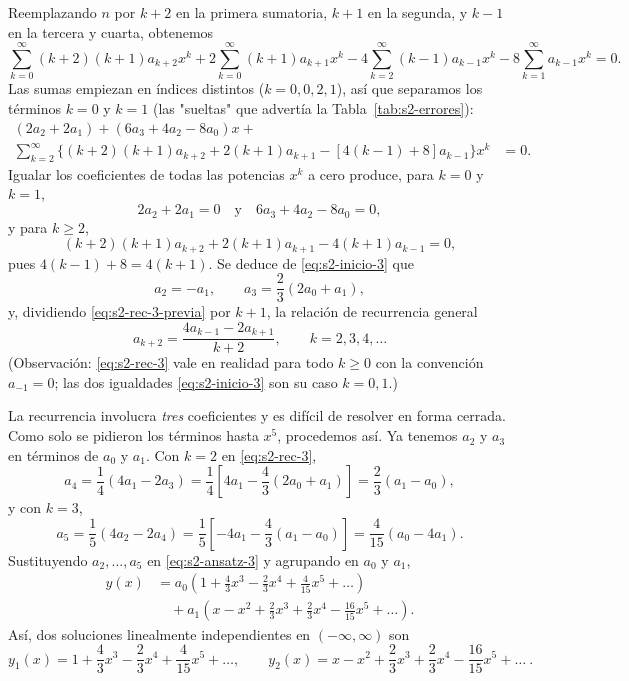 \begin{example}
Reemplazando $n$ por $k + 2$ en la primera sumatoria, $k + 1$ en la segunda, y $k - 1$ en la tercera y cuarta, obtenemos
\[ \sum_{k=0}^{\infty} (k+2)(k+1)a_{k+2}x^k + 2\sum_{k=0}^{\infty} (k+1)a_{k+1}x^k - 4\sum_{k=2}^{\infty} (k-1)a_{k-1}x^k - 8\sum_{k=1}^{\infty} a_{k-1}x^k = 0. \]
Las sumas empiezan en índices distintos ($k=0,0,2,1$), así que separamos los términos $k = 0$ y $k = 1$ (las "sueltas" que advertía la Tabla~\ref{tab:s2-errores}):
\begin{align*}
(2a_2 + 2a_1) + (6a_3 + 4a_2 - 8a_0)x + \quad & \\
\sum_{k=2}^{\infty} \{(k+2)(k+1)a_{k+2} + 2(k+1)a_{k+1} - [4(k-1) + 8]a_{k-1}\}x^k &= 0.
\end{align*}
Igualar los coeficientes de todas las potencias $x^k$ a cero produce, para $k = 0$ y $k = 1$,
\begin{equation}
2a_2 + 2a_1 = 0 \quad \text{y} \quad 6a_3 + 4a_2 - 8a_0 = 0,
\label{eq:s2-inicio-3}
\end{equation}
y para $k \ge 2$,
\begin{equation}
(k+2)(k+1)a_{k+2} + 2(k+1)a_{k+1} - 4(k+1)a_{k-1} = 0,
\label{eq:s2-rec-3-previa}
\end{equation}
pues $4(k-1)+8=4(k+1)$. Se deduce de \eqref{eq:s2-inicio-3} que
\begin{equation}
a_2 = -a_1, \qquad a_3 = \frac{2}{3}(2a_0 + a_1),
\label{eq:s2-a2a3}
\end{equation}
y, dividiendo \eqref{eq:s2-rec-3-previa} por $k+1$, la relación de recurrencia general
\begin{equation}
a_{k+2} = \frac{4a_{k-1} - 2a_{k+1}}{k+2}, \qquad k = 2, 3, 4, \dots
\label{eq:s2-rec-3}
\end{equation}
(Observación: \eqref{eq:s2-rec-3} vale en realidad para todo $k\ge 0$ con la convención $a_{-1}=0$; las dos igualdades \eqref{eq:s2-inicio-3} son su caso $k=0,1$.)
 
La recurrencia involucra \emph{tres} coeficientes y es difícil de resolver en forma cerrada. Como solo se pidieron los términos hasta $x^5$, procedemos así. Ya tenemos $a_2$ y $a_3$ en términos de $a_0$ y $a_1$. Con $k = 2$ en \eqref{eq:s2-rec-3},
\[ a_4 = \frac{1}{4}(4a_1 - 2a_3) = \frac{1}{4}\left[ 4a_1 - \frac{4}{3}(2a_0 + a_1) \right] = \frac{2}{3}(a_1 - a_0), \]
y con $k = 3$,
\[ a_5 = \frac{1}{5}(4a_2 - 2a_4) = \frac{1}{5}\left[ -4a_1 - \frac{4}{3}(a_1 - a_0) \right] = \frac{4}{15}(a_0 - 4a_1). \]
Sustituyendo $a_2,\dots,a_5$ en \eqref{eq:s2-ansatz-3} y agrupando en $a_0$ y $a_1$,
\begin{align*}
y(x) &= a_0 \left( 1 + \frac{4}{3}x^3 - \frac{2}{3}x^4 + \frac{4}{15}x^5 + \dots \right) \\
&\quad + a_1 \left( x - x^2 + \frac{2}{3}x^3 + \frac{2}{3}x^4 - \frac{16}{15}x^5 + \dots \right).
\end{align*}
Así, dos soluciones linealmente independientes en $(-\infty, \infty)$ son
\[ y_1(x) = 1 + \frac{4}{3}x^3 - \frac{2}{3}x^4 + \frac{4}{15}x^5 + \dots, \qquad y_2(x) = x - x^2 + \frac{2}{3}x^3 + \frac{2}{3}x^4 - \frac{16}{15}x^5 + \dots \ . \tag*{$\square$} \]
\end{example}
 
